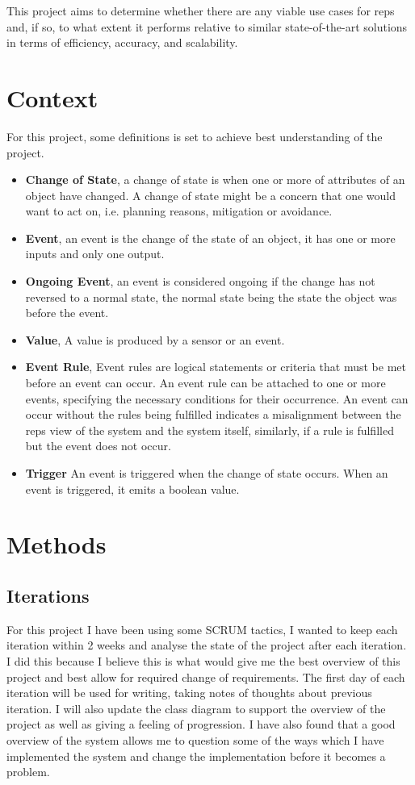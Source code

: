\documentclass[conference]{IEEEtran}
\begin{document}
		This project aims to determine whether there are any viable use cases for \gls{reps} and, if so, to what extent it performs relative to similar state-of-the-art solutions in terms of efficiency, accuracy, and scalability.
		
	\section{Context}
		For this project, some definitions is set to achieve best understanding of the project.
		\begin{itemize}
			\item \textbf{Change of State}, a change of state is when one or more of attributes of an object have changed. A change of state might be a concern that one would want to act on, i.e. planning reasons, mitigation or avoidance.
			\item \textbf{Event}, an event is the change of the state of an object, it has one or more inputs and  only one output.
			\item \textbf{Ongoing Event}, an event is considered ongoing if the change has not reversed to a normal state, the normal state being the state the object was before the event.
			\item \textbf{Value}, A value is produced by a sensor or an event.
			\item \textbf{Event Rule}, Event rules are logical statements or criteria that must be met before an event can occur. An event rule can be attached to one or more events, specifying the necessary conditions for their occurrence. An event can occur without the rules being fulfilled indicates a misalignment between the \gls{reps} view of the system and the system itself, similarly, if a rule is fulfilled but the event does not occur.
			\item \textbf{Trigger} An event is triggered when the change of state occurs. When an event is triggered, it emits a boolean value.
		\end{itemize}
		
	\section{Methods}
		\subsection{Iterations}
			For this project I have been using some SCRUM tactics, I wanted to keep each iteration within 2 weeks and analyse the state of the project after each iteration. I did this because I believe this is what would give me the best overview of this project and best allow for required change of requirements. The first day of each iteration will be used for writing, taking notes of thoughts about previous iteration. I will also update the class diagram to support the overview of the project as well as giving a feeling of progression. I have also found that a good overview of the system allows me to question some of the ways which I have implemented the system and change the implementation before it becomes a problem.
\end{document}
